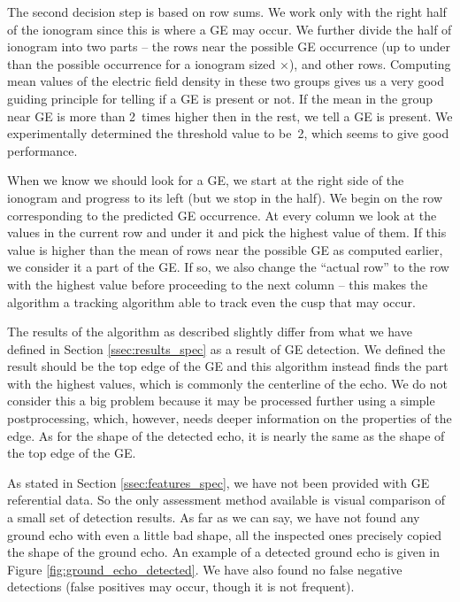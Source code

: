 The second decision step is based on row sums. We work only with the right half of the ionogram since this is where a GE may occur. We further divide the half of ionogram into two parts -- the rows near the possible GE occurrence (up to  under than the possible occurrence for a ionogram sized $\times$), and other rows. Computing mean values of the electric field density in these two groups gives us a very good guiding principle for telling if a GE is present or not. If the mean in the group near GE is more than 2~times higher then in the rest, we tell a GE is present. We experimentally determined the threshold value to be~2, which seems to give good performance.

When we know we should look for a GE, we start at the right side of the ionogram and progress to its left (but we stop in the half). We begin on the row corresponding to the predicted GE occurrence. At every column we look at the values in the current row and  under it and pick the highest value of them. If this value is higher than the mean of rows near the possible GE as computed earlier, we consider it a part of the GE. If so, we also change the ``actual row'' to the row with the highest value before proceeding to the next column -- this makes the algorithm a tracking algorithm able to track even the cusp that may occur.

The results of the algorithm as described slightly differ from what we have defined in Section \ref{ssec:results_spec} as a result of GE detection. We defined the result should be the top edge of the GE and this algorithm instead finds the part with the highest values, which is commonly the centerline of the echo. We do not consider this a big problem because it may be processed further using a simple postprocessing, which, however, needs deeper information on the properties of the edge. As for the shape of the detected echo, it is nearly the same as the shape of the top edge of the GE.

As stated in Section \ref{ssec:features_spec}, we have not been provided with GE referential data. So the only assessment method available is visual comparison of a small set of detection results. As far as we can say, we have not found any ground echo with even a little bad shape, all the inspected ones precisely copied the shape of the ground echo. An example of a detected ground echo is given in Figure \ref{fig:ground_echo_detected}. We have also found no false negative detections (false positives may occur, though it is not frequent).

